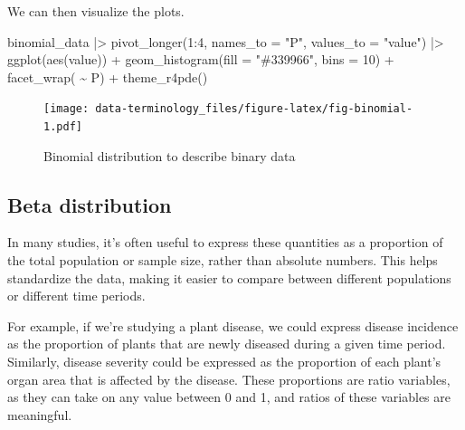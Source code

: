\documentclass[
  letterpaper,
]{book}
\newenvironment{Shaded}{\begin{snugshade}}{\end{snugshade}}
\newcommand{\AttributeTok}[1]{\textcolor[rgb]{0.40,0.45,0.13}{#1}}
\newcommand{\DecValTok}[1]{\textcolor[rgb]{0.68,0.00,0.00}{#1}}
\newcommand{\FunctionTok}[1]{\textcolor[rgb]{0.28,0.35,0.67}{#1}}
\newcommand{\NormalTok}[1]{\textcolor[rgb]{0.00,0.23,0.31}{#1}}
\newcommand{\SpecialCharTok}[1]{\textcolor[rgb]{0.37,0.37,0.37}{#1}}
\newcommand{\StringTok}[1]{\textcolor[rgb]{0.13,0.47,0.30}{#1}}
\begin{document}
We can then visualize the plots.

\begin{Shaded}
\begin{Highlighting}[]
\NormalTok{binomial\_data }\SpecialCharTok{|\textgreater{}}
  \FunctionTok{pivot\_longer}\NormalTok{(}\DecValTok{1}\SpecialCharTok{:}\DecValTok{4}\NormalTok{, }\AttributeTok{names\_to =} \StringTok{"P"}\NormalTok{,}
               \AttributeTok{values\_to =} \StringTok{"value"}\NormalTok{) }\SpecialCharTok{|\textgreater{}}
  \FunctionTok{ggplot}\NormalTok{(}\FunctionTok{aes}\NormalTok{(value)) }\SpecialCharTok{+}
  \FunctionTok{geom\_histogram}\NormalTok{(}\AttributeTok{fill =} \StringTok{"\#339966"}\NormalTok{,}
                 \AttributeTok{bins =} \DecValTok{10}\NormalTok{) }\SpecialCharTok{+}
  \FunctionTok{facet\_wrap}\NormalTok{( }\SpecialCharTok{\textasciitilde{}}\NormalTok{ P) }\SpecialCharTok{+}
  \FunctionTok{theme\_r4pde}\NormalTok{()}
\end{Highlighting}
\end{Shaded}

\begin{figure}

{\centering \texttt{[image: data-terminology\_files/figure-latex/fig-binomial-1.pdf]}

}

\caption{\label{fig-binomial}Binomial distribution to describe binary
data}

\end{figure}

\hypertarget{beta-distribution}{%
\subsection{Beta distribution}\label{beta-distribution}}

In many studies, it's often useful to express these quantities as a
proportion of the total population or sample size, rather than absolute
numbers. This helps standardize the data, making it easier to compare
between different populations or different time periods.

For example, if we're studying a plant disease, we could express disease
incidence as the proportion of plants that are newly diseased during a
given time period. Similarly, disease severity could be expressed as the
proportion of each plant's organ area that is affected by the disease.
These proportions are ratio variables, as they can take on any value
between 0 and 1, and ratios of these variables are meaningful.
\end{document}
